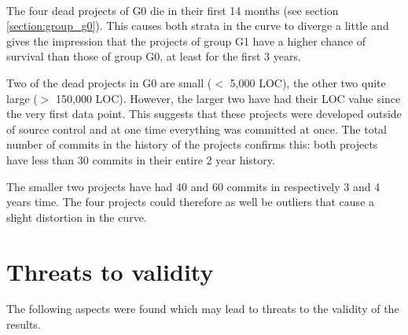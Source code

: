 \paragraph{}
The four dead projects of G0 die in their first 14 months (see section
\ref{section:group_g0}). This causes both strata in the curve to diverge a
little and gives the impression that the projects of group G1 have a higher
chance of survival than those of group G0, at least for the first 3 years.

Two of the dead projects in G0 are small ($<$ 5,000 LOC), the other two
quite large ($>$ 150,000 LOC). However, the larger two have had their LOC value
since the very first data point. This suggests that these projects were
developed outside of source control and at one time everything was committed at
once. The total number of commits in the history of the projects confirms this:
both projects have less than 30 commits in their entire 2 year history.

The smaller two projects have had 40 and 60 commits in respectively 3 and 4
years time. The four projects could therefore as well be outliers that cause a
slight distortion in the curve.


\section{Threats to validity}
The following aspects were found which may lead to threats to the validity of
the results.

